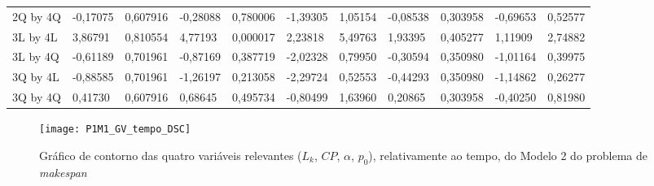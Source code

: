 \begin{table}[H]
{\begin{tabular}{lllllllllll}
\rowcolor[HTML]{FFFFFF} 
{\color[HTML]{000000} 2Q by 4Q}       & {\color[HTML]{000000} -0,17075} & {\color[HTML]{000000} 0,607916} & {\color[HTML]{000000} -0,28088} & {\color[HTML]{000000} 0,780006} & {\color[HTML]{000000} -1,39305}       & {\color[HTML]{000000} 1,05154}        & {\color[HTML]{000000} -0,08538} & {\color[HTML]{000000} 0,303958}      & {\color[HTML]{000000} -0,69653}       & {\color[HTML]{000000} 0,52577}        \\
\rowcolor[HTML]{FFFFFF} 
{\color[HTML]{000000} 3L by 4L}       & {\color[HTML]{FF0000} 3,86791}  & {\color[HTML]{FF0000} 0,810554} & {\color[HTML]{FF0000} 4,77193}  & {\color[HTML]{FF0000} 0,000017} & {\color[HTML]{FF0000} 2,23818}        & {\color[HTML]{FF0000} 5,49763}        & {\color[HTML]{FF0000} 1,93395}  & {\color[HTML]{FF0000} 0,405277}      & {\color[HTML]{FF0000} 1,11909}        & {\color[HTML]{FF0000} 2,74882}        \\
\rowcolor[HTML]{FFFFFF} 
{\color[HTML]{000000} 3L by 4Q}       & {\color[HTML]{000000} -0,61189} & {\color[HTML]{000000} 0,701961} & {\color[HTML]{000000} -0,87169} & {\color[HTML]{000000} 0,387719} & {\color[HTML]{000000} -2,02328}       & {\color[HTML]{000000} 0,79950}        & {\color[HTML]{000000} -0,30594} & {\color[HTML]{000000} 0,350980}      & {\color[HTML]{000000} -1,01164}       & {\color[HTML]{000000} 0,39975}        \\
\rowcolor[HTML]{FFFFFF} 
{\color[HTML]{000000} 3Q by 4L}       & {\color[HTML]{000000} -0,88585} & {\color[HTML]{000000} 0,701961} & {\color[HTML]{000000} -1,26197} & {\color[HTML]{000000} 0,213058} & {\color[HTML]{000000} -2,29724}       & {\color[HTML]{000000} 0,52553}        & {\color[HTML]{000000} -0,44293} & {\color[HTML]{000000} 0,350980}      & {\color[HTML]{000000} -1,14862}       & {\color[HTML]{000000} 0,26277}        \\
\rowcolor[HTML]{FFFFFF} 
{\color[HTML]{000000} 3Q by 4Q}       & {\color[HTML]{000000} 0,41730}  & {\color[HTML]{000000} 0,607916} & {\color[HTML]{000000} 0,68645}  & {\color[HTML]{000000} 0,495734} & {\color[HTML]{000000} -0,80499}       & {\color[HTML]{000000} 1,63960}        & {\color[HTML]{000000} 0,20865}  & {\color[HTML]{000000} 0,303958}      & {\color[HTML]{000000} -0,40250}       & {\color[HTML]{000000} 0,81980}       
\end{tabular}
}
\end{table}

\begin{figure}[H]
\caption{Gráfico de contorno das quatro variáveis relevantes ($L_{k}$, $CP$, $\alpha$, $p_{0}$), relativamente ao tempo, do Modelo 2 do problema de \textit{makespan}}
\centering
\texttt{[image: P1M1\_GV\_tempo\_DSC]}
\end{figure}



